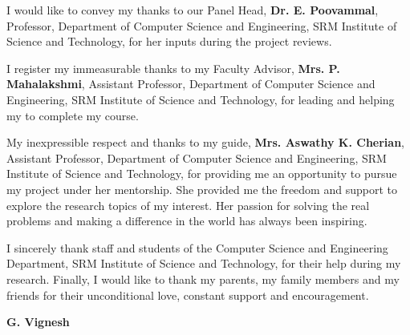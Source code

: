 \documentclass[BTech]{srmuthesis}
\begin{document}
I would like to convey my thanks to our Panel Head, {\bf Dr. E. Poovammal}, Professor, Department of Computer Science and Engineering, SRM Institute of Science and Technology, for her inputs during the project reviews.

I register my immeasurable thanks to my Faculty Advisor, {\bf Mrs. P. Mahalakshmi}, Assistant Professor, Department of Computer Science and Engineering, SRM Institute of Science and Technology, for leading and helping my to complete my course.

My inexpressible respect and thanks to my guide, {\bf Mrs. Aswathy K. Cherian}, Assistant Professor, Department of Computer Science and Engineering, SRM Institute of Science and Technology, for providing me an opportunity to pursue my project under her mentorship. She provided me the freedom and support to explore the research topics of my interest. Her passion for solving the real problems and making a difference in the world has always been inspiring.

I sincerely thank staff and students of the Computer Science and Engineering Department, SRM Institute of Science and Technology, for their help during my research. Finally, I would like to thank my parents, my family members and my friends for their unconditional love, constant support and encouragement.

\begin{flushright}
	{\bf G. Vignesh}
\end{flushright}

\begin{singlespace}
	\tableofcontents
	\thispagestyle{empty}
	
	\listoftables
	\listoffigures
\end{singlespace}


\abbreviations
\begin{acronym}
	
\end{acronym}
\end{document}
